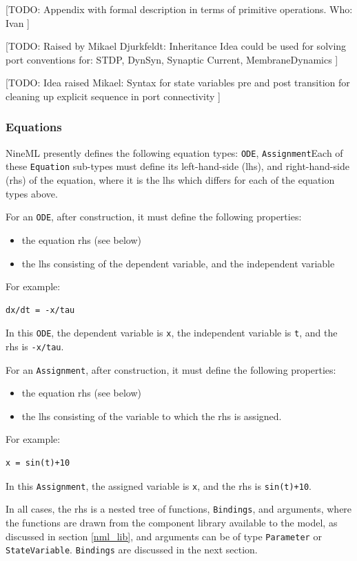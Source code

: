 \documentclass[a4paper]{article}
\newcommand\nmlClass[1]{{\tt #1}}
\begin{document}
[TODO:
Appendix with formal description in terms of primitive operations.
Who: Ivan
]

[TODO:
Raised by Mikael Djurkfeldt: Inheritance
Idea could be used for solving port conventions for:
STDP, DynSyn, Synaptic Current, MembraneDynamics
]

[TODO:
Idea raised Mikael: Syntax for state variables pre and post
transition for cleaning up explicit sequence in port connectivity
]

\subsubsection{Equations}

NineML presently defines the following equation types: \nmlClass{ODE},
\nmlClass{Assignment}Each of these \nmlClass{Equation} sub-types must define its
left-hand-side (lhs), and right-hand-side (rhs) of the equation, where
it is the lhs which differs for each of the equation types above.

For an \nmlClass{ODE}, after construction, it must define the following properties:
\begin{itemize}
\item the equation rhs (see below)
\item the lhs consisting of the dependent variable, and the independent variable
\end{itemize}
For example:
\begin{lstlisting}[style=display]
dx/dt = -x/tau
\end{lstlisting}
In this \nmlClass{ODE}, the dependent variable is \verb^x^, the independent
variable is \verb^t^, and the rhs is \verb^-x/tau^.

For an \nmlClass{Assignment}, after construction, it must define the following properties:
\begin{itemize}
\item the equation rhs (see below)
\item the lhs consisting of the variable to which the rhs is assigned.
\end{itemize}
For example:
\begin{lstlisting}[style=display]
x = sin(t)+10
\end{lstlisting}
In this \nmlClass{Assignment}, the assigned variable is \verb^x^, and the rhs is \verb^sin(t)+10^.

In all cases, the rhs is a nested tree of functions, \nmlClass{Bindings}, and arguments,
where the functions are drawn from the component library available to
the model, as discussed in section \ref{nml_lib}, and arguments
can be of type \nmlClass{Parameter} or \nmlClass{StateVariable}.  \nmlClass{Bindings} are discussed in the next section.
\end{document}
